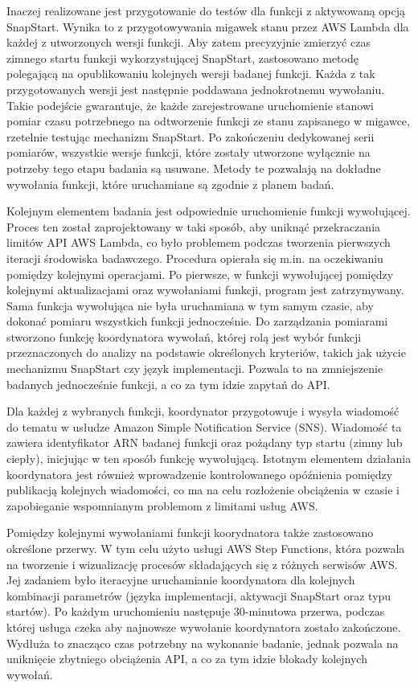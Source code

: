 Inaczej realizowane jest przygotowanie do testów dla funkcji z aktywowaną opcją SnapStart.
Wynika to z przygotowywania migawek stanu przez AWS Lambda dla każdej z utworzonych wersji funkcji.
Aby zatem precyzyjnie zmierzyć czas zimnego startu funkcji wykorzystującej SnapStart, zastosowano metodę polegającą na opublikowaniu kolejnych wersji badanej funkcji. 
Każda z tak przygotowanych wersji jest następnie poddawana jednokrotnemu wywołaniu. 
Takie podejście gwarantuje, że każde zarejestrowane uruchomienie stanowi pomiar czasu potrzebnego na odtworzenie funkcji ze stanu zapisanego w migawce, rzetelnie testując mechanizm SnapStart. 
Po zakończeniu dedykowanej serii pomiarów, wszystkie wersje funkcji, które zostały utworzone wyłącznie na potrzeby tego etapu badania są usuwane. 
Metody te pozwalają na dokładne wywołania funkcji, które uruchamiane są zgodnie z planem badań.

Kolejnym elementem badania jest odpowiednie uruchomienie funkcji wywołującej.
Proces ten został zaprojektowany w taki sposób, aby uniknąć przekraczania limitów API AWS Lambda, co było problemem podczas tworzenia pierwszych iteracji środowiska badawczego.
Procedura opierała się m.in. na oczekiwaniu pomiędzy kolejnymi operacjami.
Po pierwsze, w funkcji wywołującej pomiędzy kolejnymi aktualizacjami oraz wywołaniami funkcji, program jest zatrzymywany.
Sama funkcja wywołująca nie była uruchamiana w tym samym czasie, aby dokonać pomiaru wszystkich funkcji jednocześnie.
Do zarządzania pomiarami stworzono funkcję koordynatora wywołań, której rolą jest wybór funkcji przeznaczonych do analizy na podstawie określonych kryteriów, takich jak użycie mechanizmu SnapStart czy język implementacji.
Pozwala to na zmniejszenie badanych jednocześnie funkcji, a co za tym idzie zapytań do API.

Dla każdej z wybranych funkcji, koordynator przygotowuje i wysyła wiadomość do tematu w usłudze Amazon Simple Notification Service (SNS).
Wiadomość ta zawiera identyfikator ARN badanej funkcji oraz pożądany typ startu (zimny lub ciepły), inicjując w ten sposób funkcję wywołującą.
Istotnym elementem działania koordynatora jest również wprowadzenie kontrolowanego opóźnienia pomiędzy publikacją kolejnych wiadomości, co ma na celu rozłożenie obciążenia w czasie i zapobieganie wspomnianym problemom z limitami usług AWS.

Pomiędzy kolejnymi wywołaniami funkcji koorydnatora także zastosowano określone przerwy.
W tym celu użyto usługi AWS Step Functions, która pozwala na tworzenie i wizualizację procesów składających się z różnych serwisów AWS.
Jej zadaniem było iteracyjne uruchamianie koordynatora dla kolejnych kombinacji parametrów (języka implementacji, aktywacji SnapStart oraz typu startów).
Po każdym uruchomieniu następuje 30-minutowa przerwa, podczas której usługa czeka aby najnowsze wywołanie koordynatora zostało zakończone.
Wydłuża to znacząco czas potrzebny na wykonanie badanie, jednak pozwala na uniknięcie zbytniego obciążenia API, a co za tym idzie blokady kolejnych wywołań.

